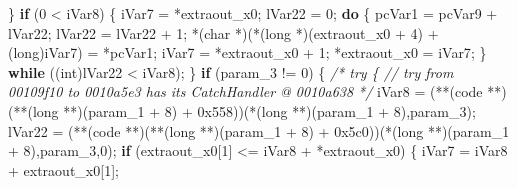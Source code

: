 \documentclass[
]{article}
\newenvironment{Shaded}{}{}
\newcommand{\BaseNTok}[1]{\textcolor[rgb]{0.25,0.63,0.44}{#1}}
\newcommand{\CommentTok}[1]{\textcolor[rgb]{0.38,0.63,0.69}{\textit{#1}}}
\newcommand{\ControlFlowTok}[1]{\textcolor[rgb]{0.00,0.44,0.13}{\textbf{#1}}}
\newcommand{\DataTypeTok}[1]{\textcolor[rgb]{0.56,0.13,0.00}{#1}}
\newcommand{\DecValTok}[1]{\textcolor[rgb]{0.25,0.63,0.44}{#1}}
\newcommand{\NormalTok}[1]{#1}
\newcommand{\OperatorTok}[1]{\textcolor[rgb]{0.40,0.40,0.40}{#1}}
\begin{document}
\begin{Shaded}
\begin{Highlighting}[]
  \OperatorTok{\}}
  \ControlFlowTok{if} \OperatorTok{(}\DecValTok{0} \OperatorTok{\textless{}}\NormalTok{ iVar8}\OperatorTok{)} \OperatorTok{\{}
\NormalTok{    iVar7 }\OperatorTok{=} \OperatorTok{*}\NormalTok{extraout\_x0}\OperatorTok{;}
\NormalTok{    lVar22 }\OperatorTok{=} \DecValTok{0}\OperatorTok{;}
    \ControlFlowTok{do} \OperatorTok{\{}
\NormalTok{      pcVar1 }\OperatorTok{=}\NormalTok{ pcVar9 }\OperatorTok{+}\NormalTok{ lVar22}\OperatorTok{;}
\NormalTok{      lVar22 }\OperatorTok{=}\NormalTok{ lVar22 }\OperatorTok{+} \DecValTok{1}\OperatorTok{;}
      \OperatorTok{*(}\DataTypeTok{char} \OperatorTok{*)(*(}\DataTypeTok{long} \OperatorTok{*)(}\NormalTok{extraout\_x0 }\OperatorTok{+} \DecValTok{4}\OperatorTok{)} \OperatorTok{+} \OperatorTok{(}\DataTypeTok{long}\OperatorTok{)}\NormalTok{iVar7}\OperatorTok{)} \OperatorTok{=} \OperatorTok{*}\NormalTok{pcVar1}\OperatorTok{;}
\NormalTok{      iVar7 }\OperatorTok{=} \OperatorTok{*}\NormalTok{extraout\_x0 }\OperatorTok{+} \DecValTok{1}\OperatorTok{;}
      \OperatorTok{*}\NormalTok{extraout\_x0 }\OperatorTok{=}\NormalTok{ iVar7}\OperatorTok{;}
    \OperatorTok{\}} \ControlFlowTok{while} \OperatorTok{((}\DataTypeTok{int}\OperatorTok{)}\NormalTok{lVar22 }\OperatorTok{\textless{}}\NormalTok{ iVar8}\OperatorTok{);}
  \OperatorTok{\}}
  \ControlFlowTok{if} \OperatorTok{(}\NormalTok{param\_3 }\OperatorTok{!=} \DecValTok{0}\OperatorTok{)} \OperatorTok{\{}
                    \CommentTok{/* try \{ // try from 00109f10 to 0010a5e3 has its CatchHandler @ 0010a638 */}
\NormalTok{    iVar8 }\OperatorTok{=} \OperatorTok{(**(}\NormalTok{code }\OperatorTok{**)(**(}\DataTypeTok{long} \OperatorTok{**)(}\NormalTok{param\_1 }\OperatorTok{+} \DecValTok{8}\OperatorTok{)} \OperatorTok{+} \BaseNTok{0x558}\OperatorTok{))(*(}\DataTypeTok{long} \OperatorTok{**)(}\NormalTok{param\_1 }\OperatorTok{+} \DecValTok{8}\OperatorTok{),}\NormalTok{param\_3}\OperatorTok{);}
\NormalTok{    lVar22 }\OperatorTok{=} \OperatorTok{(**(}\NormalTok{code }\OperatorTok{**)(**(}\DataTypeTok{long} \OperatorTok{**)(}\NormalTok{param\_1 }\OperatorTok{+} \DecValTok{8}\OperatorTok{)} \OperatorTok{+} \BaseNTok{0x5c0}\OperatorTok{))(*(}\DataTypeTok{long} \OperatorTok{**)(}\NormalTok{param\_1 }\OperatorTok{+} \DecValTok{8}\OperatorTok{),}\NormalTok{param\_3}\OperatorTok{,}\DecValTok{0}\OperatorTok{);}
    \ControlFlowTok{if} \OperatorTok{(}\NormalTok{extraout\_x0}\OperatorTok{[}\DecValTok{1}\OperatorTok{]} \OperatorTok{\textless{}=}\NormalTok{ iVar8 }\OperatorTok{+} \OperatorTok{*}\NormalTok{extraout\_x0}\OperatorTok{)} \OperatorTok{\{}
\NormalTok{      iVar7 }\OperatorTok{=}\NormalTok{ iVar8 }\OperatorTok{+}\NormalTok{ extraout\_x0}\OperatorTok{[}\DecValTok{1}\OperatorTok{];}

\end{Highlighting}
\end{Shaded}
\end{document}
